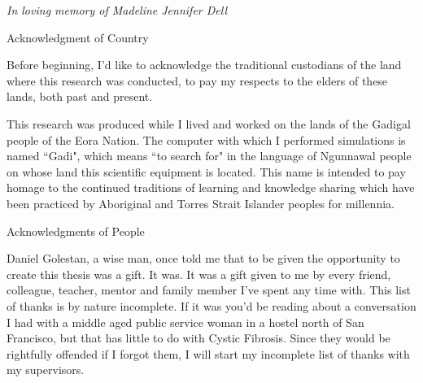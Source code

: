 \newpage


\thispagestyle{empty}


\begin{center}
	\vspace*{\fill}
\textit {In loving memory of Madeline Jennifer Dell} \\
	\vspace*{\fill}
\end{center}

\clearpage


\begin{center}
\begin{Large}
\begin{bfseries}
Acknowledgment of Country
\end{bfseries}
\end{Large}
\end{center}
Before beginning, I'd like to acknowledge the traditional custodians of the land where this research was conducted, to pay my respects to the elders of these lands, both past and present. 

This research was produced while I lived and worked on the lands of the Gadigal people of the Eora Nation. The computer with which I performed simulations is named ``Gadi", which means ``to search for" in the language of Ngunnawal people on whose land this scientific equipment is located. This name is intended to pay homage to the continued traditions of learning and knowledge sharing which have been practiced by Aboriginal and Torres Strait Islander peoples for millennia. 

\begin{center}
\begin{Large}
\begin{bfseries}
Acknowledgments of People
\end{bfseries}
\end{Large}
\end{center}
Daniel Golestan, a wise man, once told me that to be given the opportunity to create this thesis was a gift. It was. It was a gift given to me by every friend, colleague, teacher, mentor and family member I've spent any time with. This list of thanks is by nature incomplete. If it was you'd be reading about a conversation I had with a middle aged public service woman in a hostel north of San Francisco, but that has little to do with Cystic Fibrosis. Since they would be rightfully offended if I forgot them, I will start my incomplete list of thanks with my supervisors.

